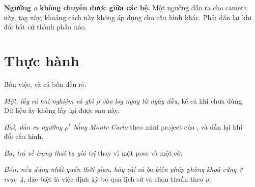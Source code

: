 \documentclass[../../marker.tex]{subfiles}
\begin{document}
\textbf{Ngưỡng \(\rho\) không chuyển được giữa các hệ.} Một ngưỡng dẫn ra cho camera này, tag này, khoảng cách này không áp dụng cho cấu hình khác. Phải dẫn lại khi đổi bất cứ thành phần nào.

\section{Thực hành}

Bốn việc, và cả bốn đều rẻ.

\emph{Một, lấy cả hai nghiệm và ghi \(\rho\) vào log ngay từ ngày đầu}, kể cả khi chưa dùng. Dữ liệu ấy không lấy lại được sau này.

\emph{Hai, dẫn ra ngưỡng \(\rho^*\) bằng Monte Carlo} theo mini project của , và dẫn lại khi đổi cấu hình.

\emph{Ba, trả về trạng thái ba giá trị} thay vì một pose và một cờ.

\emph{Bốn, nếu dùng nhất quán thời gian, hãy cài cả ba biện pháp phòng khoá cứng ở mục~4}, đặc biệt là việc định kỳ bỏ qua lịch sử và chọn thuần theo \(\rho\).
\end{document}
